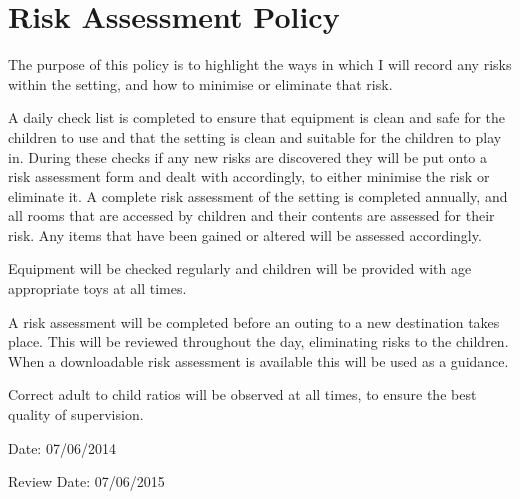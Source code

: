 \documentclass[10pt]{article}
\begin{document}
\section{Risk Assessment Policy}

The purpose of this policy is to highlight the ways in which I will
record any risks within the setting, and how to minimise or eliminate
that risk.

A daily check list is completed to ensure that equipment is clean and
safe for the children to use and that the setting is clean and suitable
for the children to play in. During these checks if any new risks are
discovered they will be put onto a risk assessment form and dealt with
accordingly, to either minimise the risk or eliminate it. A complete
risk assessment of the setting is completed annually, and all rooms that
are accessed by children and their contents are assessed for their risk.
Any items that have been gained or altered will be assessed accordingly.

Equipment will be checked regularly and children will be provided with
age appropriate toys at all times.

A risk assessment will be completed before an outing to a new
destination takes place. This will be reviewed throughout the day,
eliminating risks to the children. When a downloadable risk assessment
is available this will be used as a guidance.

Correct adult to child ratios will be observed at all times, to ensure
the best quality of supervision.

Date: 07/06/2014

Review Date: 07/06/2015

~
\end{document}

